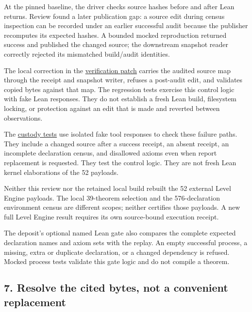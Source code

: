 \documentclass[
  11pt,
]{article}
\begin{document}
At the pinned baseline, the driver checks source hashes before and after
Lean returns. Review found a later publication gap: a source edit during
census inspection can be recorded under an earlier successful audit
because the publisher recomputes its expected hashes. A bounded mocked
reproduction returned success and published the changed source; the
downstream snapshot reader correctly rejected its mismatched build/audit
identities.

The local correction in the
\href{https://github.com/dbccpage/the_symbol_game/blob/23893fc44162555fa12ceda3e1665982e3d7a14e/omega_engine_atlas/coda_atlas/omega_engine_symbol_game/verification/source_delta.patch}{verification
patch} carries the audited source map through the receipt and snapshot
writer, refuses a post-audit edit, and validates copied bytes against
that map. The regression tests exercise this control logic with fake
Lean responses. They do not establish a fresh Lean build, filesystem
locking, or protection against an edit that is made and reverted between
observations.

The
\href{https://github.com/dbccpage/the_symbol_game/blob/52cb5457f6c485ba548cfd292f6012a941ed22cf/omega_engine_operations/tests/level_engine/test_lean.py}{custody
tests} use isolated fake tool responses to check these failure paths.
They include a changed source after a success receipt, an absent
receipt, an incomplete declaration census, and disallowed axioms even
when report replacement is requested. They test the control logic. They
are not fresh Lean kernel elaborations of the 52 payloads.

Neither this review nor the retained local build rebuilt the 52 external
Level Engine payloads. The local 39-theorem selection and the
576-declaration environment census are different scopes; neither
certifies those payloads. A new full Level Engine result requires its
own source-bound execution receipt.

The deposit's optional named Lean gate also compares the complete
expected declaration names and axiom sets with the replay. An empty
successful process, a missing, extra or duplicate declaration, or a
changed dependency is refused. Mocked process tests validate this gate
logic and do not compile a theorem.

\hypertarget{resolve-the-cited-bytes-not-a-convenient-replacement}{%
\subsection{7. Resolve the cited bytes, not a convenient
replacement}\label{resolve-the-cited-bytes-not-a-convenient-replacement}}
\end{document}
